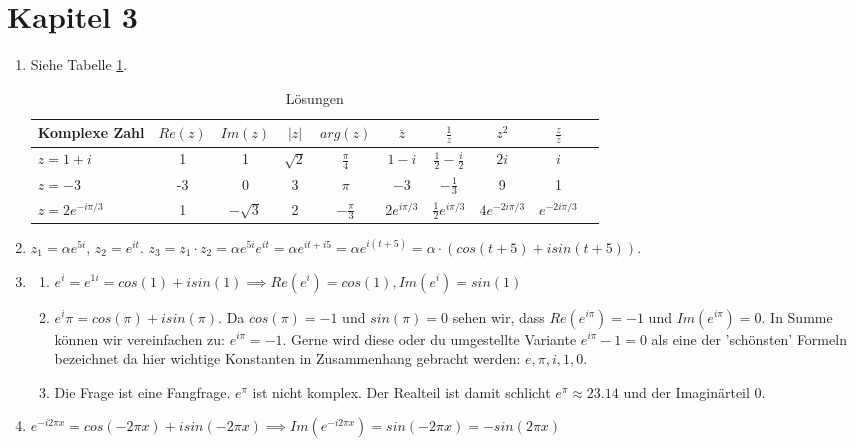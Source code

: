 \section{Kapitel 3}
\begin{enumerate}
\item Siehe Tabelle \ref{tab:sol_3_1}.

\renewcommand{\arraystretch}{1.5}

\begin{table}[H] 
\centering
\begin{tabular}{|>{\raggedright}m{3cm}|c|c|c|c|c|c|c|c|c|}
\hline
\textbf{Komplexe Zahl} & $Re(z)$ & $Im(z)$ & $|z|$ & $arg(z)$ & $\overline{z}$ & $\frac{1}{z}$ & $z^2$ & $\frac{z}{\overline{z}}$ \\
\hline
$z = 1 + i$ & 1 & 1 & $\sqrt{2}$ & $\frac{\pi}{4}$ & $1 - i$ & $\frac{1}{2} - \frac{i}{2}$ & $2i$ & $i$ \\
\hline
$z = -3$ & -3 & 0 & 3 & $\pi$ & $-3$ & $-\frac{1}{3}$ & 9 & 1 \\
\hline
$z = 2e^{-i\pi/3}$ & 1 & $-\sqrt{3}$ & 2 & $-\frac{\pi}{3}$ & $2e^{i\pi/3}$  & $\frac{1}{2}e^{i\pi/3}$ & $4e^{-2i\pi/3}$ & $e^{-2i\pi/3}$ \\
\hline
\end{tabular}
\caption{Lösungen}
\label{tab:sol_3_1}
\end{table}

\item $z_1 = \alpha e^{5i}$, 
$z_2 = e^{it}$. 
$z_3 = z_1 \cdot z_2 = \alpha e^{5i} e^{it} = \alpha e^{it + i5} = \alpha e^{i(t + 5)} = \alpha \cdot \left(cos(t+5) + i sin(t+5) \right)$.
\item 
\begin{enumerate}
\item $e^i = e^{1i} = cos(1) + i sin(1) \implies Re(e^i) = cos(1) ,Im(e^i) = sin(1)$
\item $e^i\pi = cos(\pi) + i sin(\pi)$. Da $cos(\pi) = -1$ und $sin(\pi) = 0$ sehen wir, dass $Re(e^{i\pi}) = -1$ und $Im(e^{i\pi}) = 0$. In Summe können wir vereinfachen zu: $e^{i\pi} = -1$. Gerne wird diese oder du umgestellte Variante $e^{i\pi} -1 = 0$ als eine der 'schönsten' Formeln bezeichnet da hier wichtige Konstanten in Zusammenhang gebracht werden: $e, \pi, i, 1, 0$.  
\item Die Frage ist eine Fangfrage. $e^{\pi}$ ist nicht komplex. Der Realteil ist damit schlicht $e^{\pi} \approx 23.14$ und der Imaginärteil $0$.
\end{enumerate}
\item $e^{-i2\pi x} = cos(-2\pi x) + i sin(-2\pi x) \implies Im(e^{-i2\pi x}) = sin(-2\pi x) = -sin(2\pi x)$


\end{enumerate}
